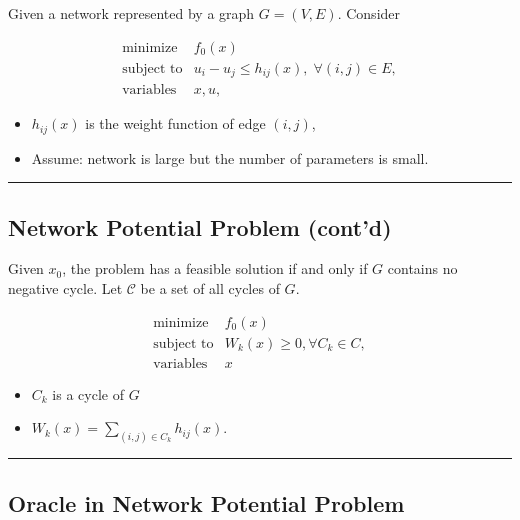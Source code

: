 \documentclass[]{article}
\begin{document}
Given a network represented by a graph \(G = (V, E)\). Consider

\[\begin{array}{ll}
    \text{minimize} & f_0(x) \\
    \text{subject to} & u_i - u_j \le h_{ij}(x), \; \forall (i, j) \in E ,\\
    \text{variables} &x, u ,
   \end{array}\]

\begin{itemize}
\item
  \(h_{ij}(x)\) is the weight function of edge \((i,j)\),
\item
  Assume: network is large but the number of parameters is small.
\end{itemize}

\begin{center}\rule{0.5\linewidth}{\linethickness}\end{center}

\hypertarget{network-potential-problem-contd}{%
\subsection{Network Potential Problem
(cont'd)}\label{network-potential-problem-contd}}

Given \(x_0\), the problem has a feasible solution if and only if \(G\)
contains no negative cycle. Let \(\mathcal{C}\) be a set of all cycles
of \(G\).

\[\begin{array}{ll}
    \text{minimize} & f_0(x) \\
    \text{subject to} & W_k(x) \ge 0, \forall C_k \in C ,\\
       \text{variables} & x
   \end{array}\]

\begin{itemize}
\item
  \(C_k\) is a cycle of \(G\)
\item
  \(W_k(x) = \sum_{ (i,j)\in C_k} h_{ij}(x)\).
\end{itemize}

\begin{center}\rule{0.5\linewidth}{\linethickness}\end{center}

\hypertarget{oracle-in-network-potential-problem}{%
\subsection{Oracle in Network Potential
Problem}\label{oracle-in-network-potential-problem}}
\end{document}
